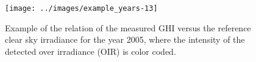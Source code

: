 \documentclass[preprint, 5p,
authoryear]{elsarticle} %
\begin{document}
\begin{figure}[H]

{\centering \texttt{[image: ../images/example\_years-13]} 

}

\caption{Example of the relation of the measured GHI versus the reference clear sky irradiance for the year 2005, where the intensity of the detected over irradiance (OIR) is color coded.}\label{fig:example-year}
\end{figure}


\end{document}
